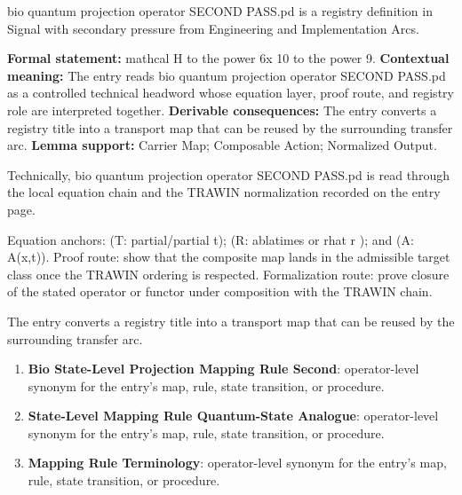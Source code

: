 
\begingroup\small
{}
bio quantum projection operator SECOND PASS.pd is a registry definition in Signal with secondary pressure from Engineering and Implementation Arcs.

\begingroup\footnotesize\setlength{\emergencystretch}{3em}\sloppy
\textbf{Formal statement:} mathcal H to the power 6x 10 to the power 9. \textbf{Contextual meaning:} The entry reads bio quantum projection operator SECOND PASS.pd as a controlled technical headword whose equation layer, proof route, and registry role are interpreted together. \textbf{Derivable consequences:} The entry converts a registry title into a transport map that can be reused by the surrounding transfer arc. \textbf{Lemma support:} Carrier Map; Composable Action; Normalized Output.\par
\endgroup

Technically, bio quantum projection operator SECOND PASS.pd is read through the local equation chain and the TRAWIN normalization recorded on the entry page.

Equation anchors: (T: partial/partial t); (R: ablatimes or rhat r ); and (A: A(x,t)). Proof route: show that the composite map lands in the admissible target class once the TRAWIN ordering is respected. Formalization route: prove closure of the stated operator or functor under composition with the TRAWIN chain.

The entry converts a registry title into a transport map that can be reused by the surrounding transfer arc.
\endgroup

\begin{enumerate}[leftmargin=1.6em,itemsep=6pt,topsep=4pt]
\item \textbf{Bio State-Level Projection Mapping Rule Second}: operator-level synonym for the entry's map, rule, state transition, or procedure.
\item \textbf{State-Level Mapping Rule Quantum-State Analogue}: operator-level synonym for the entry's map, rule, state transition, or procedure.
\item \textbf{Mapping Rule Terminology}: operator-level synonym for the entry's map, rule, state transition, or procedure.
\end{enumerate}


